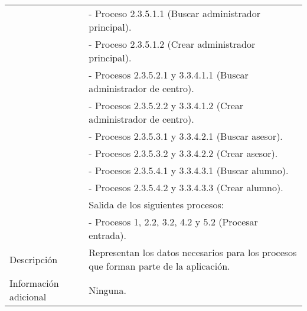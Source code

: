 \begin{center}
\begin{longtable}{| l | p{9cm} |}
                         & - Proceso 2.3.5.1.1 (Buscar administrador principal).\\
                         & - Proceso 2.3.5.1.2 (Crear administrador principal).\\
                         & - Procesos 2.3.5.2.1 y 3.3.4.1.1 (Buscar administrador de centro).\\
                         & - Procesos 2.3.5.2.2 y 3.3.4.1.2 (Crear administrador de centro).\\
                         & - Procesos 2.3.5.3.1 y 3.3.4.2.1 (Buscar asesor).\\
                         & - Procesos 2.3.5.3.2 y 3.3.4.2.2 (Crear asesor).\\
                         & - Procesos 2.3.5.4.1 y 3.3.4.3.1 (Buscar alumno).\\
                         & - Procesos 2.3.5.4.2 y 3.3.4.3.3 (Crear alumno).\\
                         & Salida de los siguientes procesos:\\
                         & - Procesos 1, 2.2, 3.2, 4.2 y 5.2 (Procesar entrada).\\
    \hline
    Descripción & Representan los datos necesarios para los procesos que forman
                  parte de la aplicación.\\
    \hline
    Información adicional & Ninguna.\\
    \hline
  \end{longtable}
\end{center}

